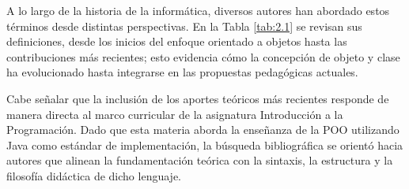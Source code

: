 A lo largo de la historia de la informática, diversos autores han abordado 
estos términos desde distintas perspectivas. En la Tabla \ref{tab:2.1} se 
revisan sus definiciones, desde los inicios del enfoque orientado a objetos 
hasta las contribuciones más recientes; esto evidencia cómo la concepción de 
objeto y clase ha evolucionado hasta integrarse en las propuestas pedagógicas 
actuales.

Cabe señalar que la inclusión de los aportes teóricos más recientes responde de 
manera directa al marco curricular de la asignatura Introducción a la 
Programación. Dado que esta materia aborda la enseñanza de la POO utilizando 
Java como estándar de implementación, la búsqueda bibliográfica se orientó 
hacia autores que alinean la fundamentación teórica con la sintaxis, la 
estructura y la filosofía didáctica de dicho lenguaje.
\vspace{1.15em}

